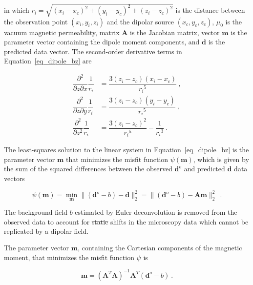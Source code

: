 \documentclass[onecolumn,12pt,a4paper]{article}
\providecommand{\DIFaddtex}[1]{{\protect\color{blue}\uwave{#1}}} %
\providecommand{\DIFdeltex}[1]{{\protect\color{red}\sout{#1}}}                      %
\providecommand{\DIFaddbegin}{} %
\providecommand{\DIFaddend}{} %
\providecommand{\DIFdelbegin}{} %
\providecommand{\DIFdelend}{} %
\providecommand{\DIFadd}[1]{\texorpdfstring{\DIFaddtex{#1}}{#1}} %
\providecommand{\DIFdel}[1]{\texorpdfstring{\DIFdeltex{#1}}{}} %
\newcommand{\DIFscaledelfig}{0.5}
\newlength{\DIFdelgraphicswidth} %
\newlength{\DIFdelgraphicsheight} %
\newcommand{\DIFaddincludegraphics}[2][]{{\color{blue}\fbox{\DIFOincludegraphics[#1]{#2}}}} %
\newcommand{\DIFdelincludegraphics}[2][]{%
\sbox{\DIFdelgraphicsbox}{\DIFOincludegraphics[#1]{#2}}%
\settoboxwidth{\DIFdelgraphicswidth}{\DIFdelgraphicsbox} %
\settoboxtotalheight{\DIFdelgraphicsheight}{\DIFdelgraphicsbox} %
\scalebox{\DIFscaledelfig}{%
\parbox[b]{\DIFdelgraphicswidth}{\usebox{\DIFdelgraphicsbox}\\[-\baselineskip] \rule{\DIFdelgraphicswidth}{0em}}\llap{\resizebox{\DIFdelgraphicswidth}{\DIFdelgraphicsheight}{%
\setlength{\unitlength}{\DIFdelgraphicswidth}%
\begin{picture}(1,1)%
\thicklines\linethickness{2pt} %
{\color[rgb]{1,0,0}\put(0,0){\framebox(1,1){}}}%
{\color[rgb]{1,0,0}\put(0,0){\line( 1,1){1}}}%
{\color[rgb]{1,0,0}\put(0,1){\line(1,-1){1}}}%
\end{picture}%
}\hspace*{3pt}}} %
} %
\DeclareRobustCommand{\DIFaddbegin}{\DIFOaddbegin \let\includegraphics\DIFaddincludegraphics} %
\DeclareRobustCommand{\DIFaddend}{\DIFOaddend \let\includegraphics\DIFOincludegraphics} %
\DeclareRobustCommand{\DIFdelbegin}{\DIFOdelbegin \let\includegraphics\DIFdelincludegraphics} %
\DeclareRobustCommand{\DIFdelend}{\DIFOaddend \let\includegraphics\DIFOincludegraphics} %
\begin{document}
    \noindent
    in which $r_i = \sqrt{(x_i - x_c)^2 + (y_i - y_c)^2 + (z_i - z_c)^2}$ is the distance between the observation point $(x_i, y_i, z_i)$ and the dipolar source $(x_c, y_c, z_c)$, $\mu_0$ is the vacuum magnetic permeability, matrix $\mathbf{A}$ is the Jacobian matrix, vector $\mathbf{m}$ is the parameter vector containing the dipole moment components, and $\mathbf{d}$ is the predicted data vector. The second-order derivative terms in Equation~\ref{eq_dipole_bz} are

    \begin{equation}
    \begin{aligned}
    \dfrac{\partial^2}{\partial z \partial x} \dfrac{1}{r_i} &=
    \dfrac{3(z_i - z_c)(x_i - x_c)}{{r_i}^5}\ ,
    \\
    \dfrac{\partial^2}{\partial z \partial y} \dfrac{1}{r_i} &=
    \dfrac{3(z_i - z_c)(y_i - y_c)}{{r_i}^5}\ ,
    \\
    \dfrac{\partial^2}{\partial z^2} \dfrac{1}{r_i} &=
    \dfrac{3(z_i - z_c)^2}{{r_i}^5} - \dfrac{1}{{r_i}^3}\ .
    \end{aligned}
    \end{equation}

    The least-squares solution to the linear system in  Equation~\ref{eq_dipole_bz} is the parameter vector $\mathbf{m}$ that minimizes the misfit function $\psi(\mathbf{m})$, which is given by the sum of the squared differences between the observed  $\mathbf{d}^o$ and predicted $\mathbf{d}$ data vectors

    \begin{equation}
    \label{psi_function}
    \psi(\mathbf{m}) 
    = \min_{\mathbf{m}} \| (\mathbf{d}^o - b) - \mathbf{d} \|_2^2
    = \| (\mathbf{d}^o - b) - \mathbf{A}\mathbf{m} \|_2^2\ 
    \ .
    \end{equation}

    \noindent
    The background field $b$ estimated by Euler deconvolution is removed from the observed data to account for \DIFdelbegin \DIFdel{static }\DIFdelend \DIFaddbegin \DIFadd{constant }\DIFaddend shifts in the microscopy data which cannot be replicated by a dipolar field.

    The parameter vector $\mathbf{m}$, containing the Cartesian components of the magnetic moment, that minimizes the misfit function $\psi$ is

    \begin{equation}
    \label{dipole_moment_solution}
    \mathbf{m} = \left(\mathbf{A}^T \mathbf{A}\right)^{-1} \mathbf{A}^T (\mathbf{d}^o - b)\ .
    \end{equation}
\end{document}

